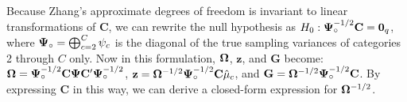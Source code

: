 




Because Zhang's approximate degrees of freedom is invariant to linear transformations of $\bm{C}$, we can rewrite the null hypothesis as $H_0: \boldsymbol\Psi_{\circ}^{-1/2} \mathbf{C} = \mathbf{0}_q$, where $\boldsymbol\Psi_{\circ} = \bigoplus_{c=2}^C \psi_c$ is the diagonal of the true sampling variances of categories 2 through $C$ only. Now in this formulation, $\boldsymbol\Omega$, $\bm{z}$, and $\bm{G}$ become: $\boldsymbol\Omega = \boldsymbol\Psi_{\circ}^{-1/2} \mathbf{C} \boldsymbol\Psi \mathbf{C}'\boldsymbol\Psi_{\circ}^{-1/2}$, $\mathbf{z} = \boldsymbol\Omega^{-1/2}\boldsymbol\Psi_{\circ}^{-1/2}\mathbf{C}\hat\mu_c$, and $\mathbf{G} = \boldsymbol\Omega^{-1/2} \boldsymbol\Psi_{\circ}^{-1/2} \mathbf{C}$. By expressing $\bm{C}$ in this way, we can derive a closed-form expression for $\boldsymbol\Omega^{-1/2}$.

